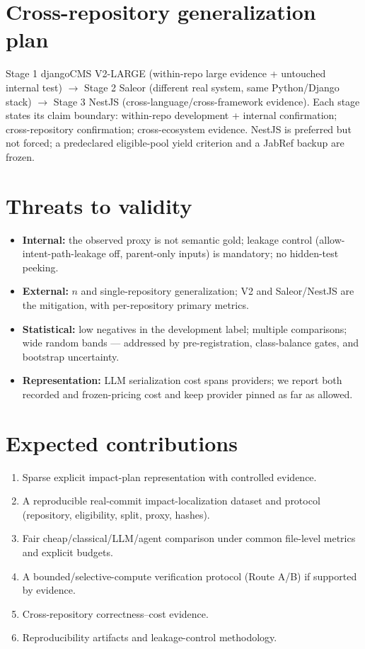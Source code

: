 \documentclass[11pt,a4paper]{article}
\begin{document}
\section{Cross-repository generalization plan}
\label{sec:gen}

Stage 1 djangoCMS V2-LARGE (within-repo large evidence + untouched internal
test) $\to$ Stage 2 Saleor (different real system, same Python/Django stack)
$\to$ Stage 3 NestJS (cross-language/cross-framework evidence). Each stage
states its claim boundary: within-repo development + internal confirmation;
cross-repository confirmation; cross-ecosystem evidence. NestJS is preferred
but not forced; a predeclared eligible-pool yield criterion and a JabRef
backup are frozen.

\section{Threats to validity}
\label{sec:threats}

\begin{itemize}
  \item \textbf{Internal:} the observed proxy is not semantic gold; leakage
  control (allow-intent-path-leakage off, parent-only inputs) is mandatory;
  no hidden-test peeking.
  \item \textbf{External:} $n$ and single-repository generalization; V2 and
  Saleor/NestJS are the mitigation, with per-repository primary metrics.
  \item \textbf{Statistical:} low negatives in the development label;
  multiple comparisons; wide random bands --- addressed by pre-registration,
  class-balance gates, and bootstrap uncertainty.
  \item \textbf{Representation:} LLM serialization cost spans providers; we
  report both recorded and frozen-pricing cost and keep provider pinned as far
  as allowed.
\end{itemize}

\section{Expected contributions}
\label{sec:contrib}

\begin{enumerate}
  \item Sparse explicit impact-plan representation with controlled evidence.
  \item A reproducible real-commit impact-localization dataset and protocol
        (repository, eligibility, split, proxy, hashes).
  \item Fair cheap/classical/LLM/agent comparison under common file-level
        metrics and explicit budgets.
  \item A bounded/selective-compute verification protocol (Route A/B) if
        supported by evidence.
  \item Cross-repository correctness--cost evidence.
  \item Reproducibility artifacts and leakage-control methodology.
\end{enumerate}
\end{document}
